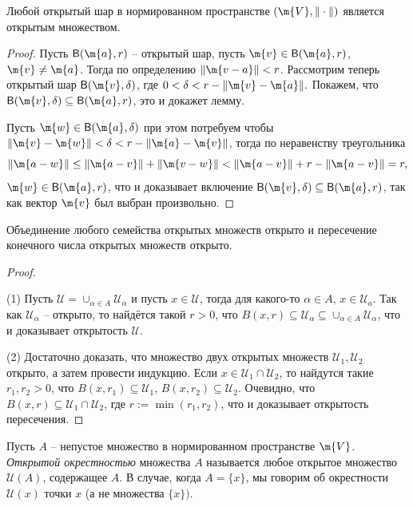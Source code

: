 \begin{lemma}\label{open_ball=open}
Любой открытый шар в нормированном пространстве $(\m{V}, \|\cdot\|)$ является открытым множеством.
\end{lemma}
\begin{proof}
 Пусть $\mathsf{B}(\m{a},r)$ -- открытый шар, пусть $\m{v} \in \mathsf{B}(\m{a},r)$, $\m{v} \ne \m{a}$. Тогда по определению $\|\m{v-a}\| < r$. Рассмотрим теперь открытый шар $\mathsf{B}(\m{v},\delta)$, где $0 < \delta < r- \|\m{v}- \m{a}\|.$ Покажем, что $\mathsf{B}(\m{v},\delta ) \subseteq \mathsf{B}(\m{a}, r)$, это и докажет лемму.

Пусть $\m{w} \in \mathsf{B}(\m{a},\delta)$ при этом потребуем чтобы $\| \m{v} - \m{w} \|<\delta < r - \|\m{a} - \m{v}\| $, тогда по неравенству треугольника
    \[
      \|\m{a-w}\| \le \|\m{a-v}\| + \|\m{v-w}\| < \|\m{a-v}\| + r - \|\m{a-v}\| = r, 
    \]
    \ie $\m{w} \in \mathsf{B}(\m{a},r)$, что и доказывает включение $\mathsf{B}(\m{v},\delta ) \subseteq \mathsf{B}(\m{a}, r)$, так как вектор $\m{v}$ был выбран произвольно. 
\end{proof}

\begin{lemma}\label{union_and_cap_of_open}
    Объединение любого семейства открытых множеств открыто и пересечение конечного числа открытых множеств открыто. 
\end{lemma}
\begin{proof}\
 
(1) Пусть $\mathscr{U} = \cup_{\alpha \in A}\mathscr{U}_\alpha$ и пусть $x \in \mathscr{U}$, тогда для какого-то $\alpha \in A$, $x \in \mathscr{U}_a$. Так как $\mathscr{U}_\alpha$ -- открыто, то найдётся такой $r >0$, что $B(x, r ) \subseteq \mathscr{U}_\alpha \subseteq \cup_{\alpha \in A}\mathscr{U}_\alpha$, что и доказывает открытость $\mathscr{U}.$

(2) Достаточно доказать, что множество двух открытых множеств $\mathscr{U}_1, \mathscr{U}_2$ открыто, а затем провести индукцию. Если $x \in \mathscr{U}_1 \cap \mathscr{U}_2$, то найдутся такие $r_1, r_2 >0$, что $B(x, r_1) \subseteq \mathscr{U}_1$, $B(x, r_2) \subseteq \mathscr{U}_2$. Очевидно, что $B(x, r) \subseteq \mathscr{U}_1 \cap \mathscr{U}_2$, где $r:= \min(r_1, r_2)$, что и доказывает открытость пересечения.
\end{proof}

\begin{definition}
    Пусть $A$ -- непустое множество в нормированном пространстве $\m{V}$. \textit{Открытой окрестностью} множества $A$ называется любое открытое множество $\mathscr{U}(A)$, содержащее $A$. В случае, когда $A = \{x\}$, мы говорим об окрестности $\mathscr{U}(x)$ точки $x$ (а не множества $\{x\}).$
\end{definition}

